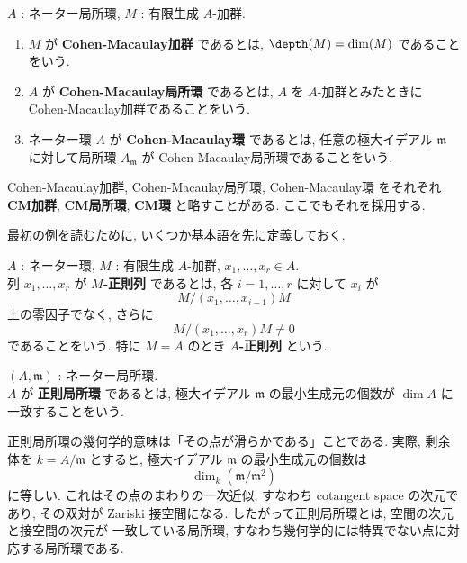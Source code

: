 \documentclass[article,paper=b5paper]{jlreq}
\begin{document}
\begin{dfn}\label{def:cm}
    \quad $A$ : ネーター局所環, \quad $M$ : 有限生成 $A$-\hspace{0pt}加群.
    \begin{enumerate}[label=(\arabic*)\,]
        \item $M$ が \textbf{Cohen-Macaulay加群} であるとは, $\depth(M) = \dim(M)$ であることをいう.
        \item $A$ が \textbf{Cohen-Macaulay局所環} であるとは, $A$ を $A$-加群とみたときに Cohen-Macaulay加群であることをいう.
        \item ネーター環 $A$ が \textbf{Cohen-Macaulay環} であるとは, 任意の極大イデアル $\mathfrak{m}$ に対して局所環 $A_{\mathfrak{m}}$ が Cohen-Macaulay局所環であることをいう.
    \end{enumerate}
    Cohen-Macaulay加群, Cohen-Macaulay局所環, Cohen-Macaulay環 をそれぞれ
    \textbf{CM加群}, \textbf{CM局所環}, \textbf{CM環} と略すことがある. ここでもそれを採用する.
\end{dfn}

最初の例を読むために, いくつか基本語を先に定義しておく.

\begin{dfn}\label{def:regular-sequence}
    \quad $A$ : ネーター環, $M$ : 有限生成 $A$-\hspace{0pt}加群, $x_1,\dots,x_r \in A$.\\
    列 $x_1,\dots,x_r$ が \textbf{$M$-正則列} であるとは, 各 $i=1,\dots,r$ に対して
    $x_i$ が
    \[
        M/(x_1,\dots,x_{i-1})M
    \]
    上の零因子でなく, さらに
    \[
        M/(x_1,\dots,x_r)M \neq 0
    \]
    であることをいう. 特に $M=A$ のとき \textbf{$A$-正則列} という.
\end{dfn}

\begin{dfn}\label{def:regular-local}
    \quad $(A,\mathfrak{m})$ : ネーター局所環. \\
    $A$ が \textbf{正則局所環} であるとは, 極大イデアル $\mathfrak{m}$ の最小生成元の個数が
    $\dim A$ に一致することをいう.
\end{dfn}

\begin{rem}
    正則局所環の幾何学的意味は「その点が滑らかである」ことである. 実際, 剰余体を
    $k=A/\mathfrak{m}$ とすると, 極大イデアル $\mathfrak{m}$ の最小生成元の個数は
    \[
        \dim_k(\mathfrak{m}/\mathfrak{m}^2)
    \]
    に等しい. これはその点のまわりの一次近似, すなわち cotangent space の次元であり,
    その双対が Zariski 接空間になる. したがって正則局所環とは, 空間の次元と接空間の次元が
    一致している局所環, すなわち幾何学的には特異でない点に対応する局所環である.
\end{rem}
\end{document}
